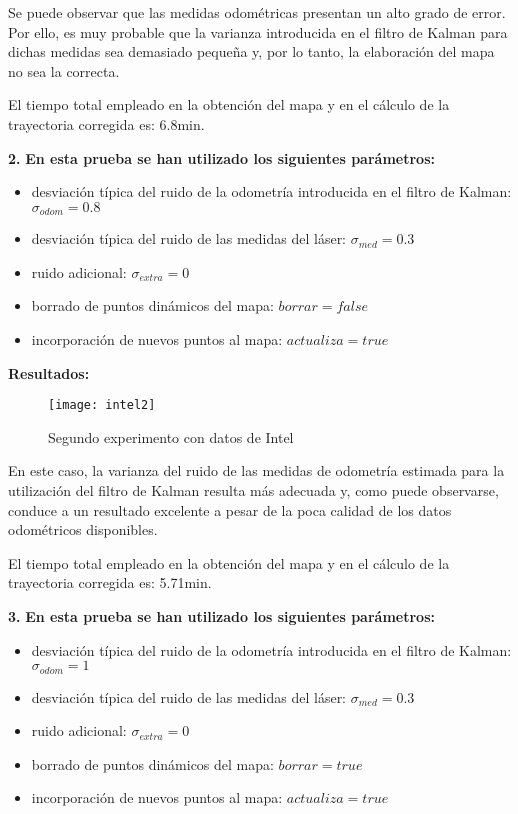 Se puede observar que las medidas odométricas presentan un alto grado de error. Por ello, es muy probable que la varianza introducida en el filtro de Kalman para dichas medidas sea demasiado pequeña y, por lo tanto, la elaboración del mapa no sea la correcta.

El tiempo total empleado en la obtención del mapa y en el cálculo de la trayectoria corregida es: 6.8min.

\noindent
\textbf{2.} \textbf{En esta prueba se han utilizado los siguientes parámetros:}
\begin{itemize}
  \item desviación típica del ruido de la odometría introducida en el filtro de Kalman: $\sigma_{odom} = 0.8$
  \item desviación típica del ruido de las medidas del láser: $\sigma_{med} = 0.3$
  \item ruido adicional: $\sigma_{extra} = 0$
  \item borrado de puntos dinámicos del mapa: $borrar = false$
  \item incorporación de nuevos puntos al mapa: $actualiza = true$
\end{itemize}


\textbf{Resultados:}

\begin{figure}[h]
  \centering\texttt{[image: intel2]}\\
  \caption{Segundo experimento con datos de Intel}\label{fg:intel2}
\end{figure}

En este caso, la varianza del ruido de las medidas de odometría estimada para la utilización del filtro de Kalman resulta más adecuada y, como puede observarse, conduce a un resultado excelente a pesar de la poca calidad de los datos odométricos disponibles.

El tiempo total empleado en la obtención del mapa y en el cálculo de la trayectoria corregida es: 5.71min.

\noindent
\textbf{3.} \textbf{En esta prueba se han utilizado los siguientes parámetros:}
\begin{itemize}
  \item desviación típica del ruido de la odometría introducida en el filtro de Kalman: $\sigma_{odom} = 1$
  \item desviación típica del ruido de las medidas del láser: $\sigma_{med} = 0.3$
  \item ruido adicional: $\sigma_{extra} = 0$
  \item borrado de puntos dinámicos del mapa: $borrar = true$
  \item incorporación de nuevos puntos al mapa: $actualiza = true$
\end{itemize}


